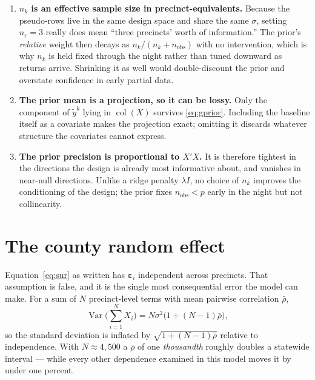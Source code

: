 \documentclass[11pt]{article}
\begin{document}
\begin{enumerate}
  \item \textbf{$n_k$ is an effective sample size in precinct-equivalents.} Because the
        pseudo-rows live in the same design space and share the same $\sigma$, setting
        $n_\tau = 3$ really does mean ``three precincts' worth of information.'' The
        prior's \emph{relative} weight then decays as $n_k/(n_k + n_{\textrm{obs}})$ with
        no intervention, which is why $n_k$ is held fixed through the night rather than
        tuned downward as returns arrive. Shrinking it as well would double-discount the
        prior and overstate confidence in early partial data.
  \item \textbf{The prior mean is a projection, so it can be lossy.} Only the component of
        $\tilde y^{k}$ lying in $\operatorname{col}(X)$ survives \eqref{eq:gprior}. Including
        the baseline itself as a covariate makes the projection exact; omitting it
        discards whatever structure the covariates cannot express.
  \item \textbf{The prior precision is proportional to $X'X$.} It is therefore tightest in
        the directions the design is already most informative about, and vanishes in
        near-null directions. Unlike a ridge penalty $\lambda I$, no choice of $n_k$
        improves the conditioning of the design; the prior fixes
        $n_{\textrm{obs}} < p$ early in the night but not collinearity.
\end{enumerate}

\section{The county random effect}\label{sec:cre}

Equation~\eqref{eq:sur} as written has $\boldsymbol\varepsilon_i$ independent across
precincts. That assumption is false, and it is the single most consequential error the
model can make. For a sum of $N$ precinct-level terms with mean pairwise correlation
$\bar\rho$,
\begin{equation}
  \operatorname{Var}\Big(\sum_{i=1}^{N} X_i\Big) = N\sigma^2\big(1 + (N-1)\bar\rho\big),
  \label{eq:rhobar}
\end{equation}
so the standard deviation is inflated by $\sqrt{1+(N-1)\bar\rho}$ relative to
independence. With $N \approx 4{,}500$ a $\bar\rho$ of one \emph{thousandth} roughly
doubles a statewide interval --- while every other dependence examined in this model moves
it by under one percent.
\end{document}
